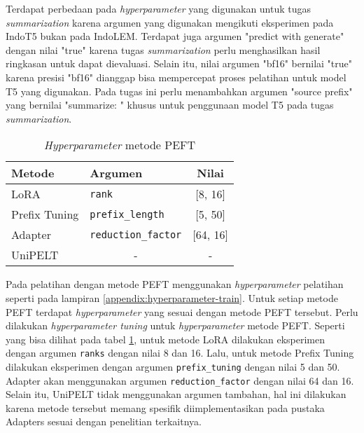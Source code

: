Terdapat perbedaan pada \textit{hyperparameter} yang digunakan untuk tugas \textit{summarization} karena argumen yang digunakan mengikuti eksperimen pada IndoT5 bukan pada IndoLEM. Terdapat juga argumen "predict with generate" dengan nilai "true" karena tugas \textit{summarization} perlu menghasilkan hasil ringkasan untuk dapat dievaluasi. Selain itu, nilai argumen "bf16" bernilai "true" karena presisi "bf16" dianggap bisa mempercepat proses pelatihan untuk model T5 yang digunakan. Pada tugas ini perlu menambahkan argumen "source prefix" yang bernilai "summarize: " khusus untuk penggunaan model T5 pada tugas \textit{summarization}.

\begin{table}[h]
    \centering
    \caption{\textit{Hyperparameter} metode PEFT}
    \label{table:hyperparameter-PEFT}
    \begin{tabular}{l|l|c}
        \toprule
        \textbf{Metode} & \textbf{Argumen} & \textbf{Nilai} \\
        \midrule
        LoRA & \texttt{rank} & [8, 16] \\
        Prefix Tuning & \texttt{prefix\_length} & [5, 50] \\
        Adapter & \texttt{reduction\_factor} & [64, 16] \\
        UniPELT & \multicolumn{1}{c|}{-}  & - \\
        \bottomrule
    \end{tabular}
\end{table}

Pada pelatihan dengan metode PEFT  menggunakan \textit{hyperparameter} pelatihan seperti pada lampiran \ref{appendix:hyperparameter-train}. Untuk setiap metode PEFT terdapat \textit{hyperparameter} yang sesuai dengan metode PEFT tersebut. Perlu dilakukan \textit{hyperparameter tuning} untuk \textit{hyperparameter} metode PEFT. Seperti yang bisa dilihat pada tabel \ref{table:hyperparameter-PEFT}, untuk metode LoRA dilakukan eksperimen dengan argumen \texttt{ranks} dengan nilai 8 dan 16. Lalu, untuk metode Prefix Tuning dilakukan eksperimen dengan argumen \texttt{prefix\_tuning} dengan nilai 5 dan 50. Adapter akan menggunakan argumen \texttt{reduction\_factor} dengan nilai 64 dan 16. Selain itu, UniPELT tidak menggunakan argumen tambahan, hal ini dilakukan karena metode tersebut memang spesifik diimplementasikan pada pustaka Adapters sesuai dengan penelitian terkaitnya.

